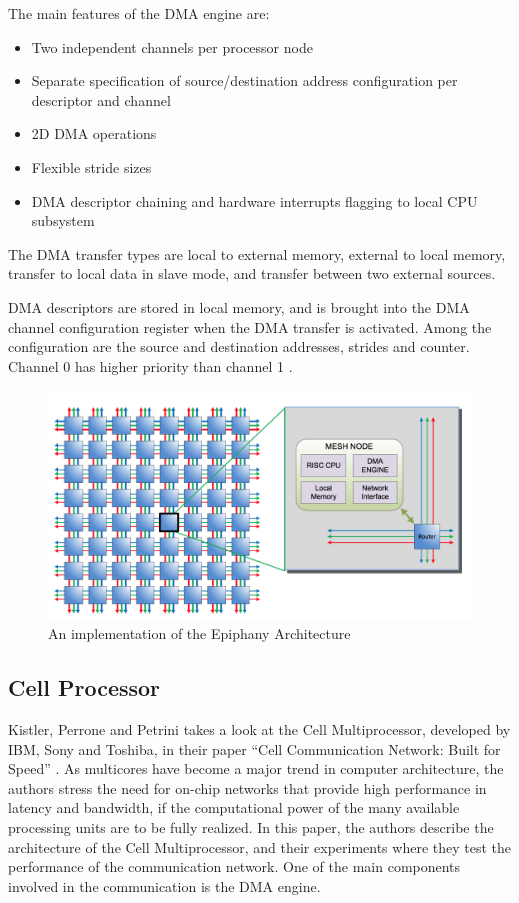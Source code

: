 The main features of the DMA engine are: 
\begin{itemize}
    \item Two independent channels per processor node
    \item Separate specification of source/destination address configuration per descriptor and channel
    \item 2D DMA operations
    \item Flexible stride sizes
    \item DMA descriptor chaining and hardware interrupts flagging to local CPU subsystem
\end{itemize}

The DMA transfer types are local to external memory, external to local memory, transfer to local data in slave mode, and transfer between two external sources.

DMA descriptors are stored in local memory, and is brought into the DMA channel configuration register when the DMA transfer is activated.
Among the configuration are the source and destination addresses, strides and counter.
Channel 0 has higher priority than channel 1 \cite{epiphany}.

\begin{figure}[htb]
    \centering
    \includegraphics[width=1\textwidth]{Figures/DMA/AdaptevaEpiphany}
    \caption{An implementation of the Epiphany Architecture \cite{epiphany}}
    \label{fig:AdaptevaEpiphany}
\end{figure}


\subsection{Cell Processor}
Kistler, Perrone and Petrini takes a look at the Cell Multiprocessor, developed by IBM, Sony and Toshiba, in their paper ``Cell Communication Network: Built for Speed'' \cite{cell}.
As multicores have become a major trend in computer architecture, the authors stress the need for on-chip networks that provide high performance in latency and bandwidth, if the computational power of the many available processing units are to be fully realized.
In this paper, the authors describe the architecture of the Cell Multiprocessor, and their experiments where they test the performance of the communication network.
One of the main components involved in the communication is the DMA engine.

